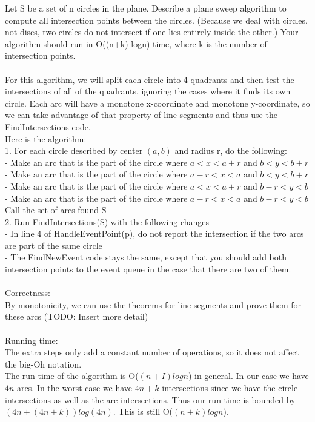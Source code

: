 \documentclass[11pt,psfig]{article}
\begin{document}
Let S be a set of n circles in the plane. Describe a plane sweep algorithm to compute all intersection points between the circles. (Because we deal with circles, not discs, two circles do not intersect if one lies entirely
inside the other.) Your algorithm should run in O((n+k) logn) time,
where k is the number of intersection points.\\
\\
For this algorithm, we will split each circle into 4 quadrants and then test the intersections of all of the quadrants, ignoring the cases where it finds its own circle. Each arc will have a monotone x-coordinate and monotone y-coordinate, so we can take advantage of that property of line segments and thus use the FindIntersections code. \\
Here is the algorithm:\\
1. For each circle described by center $(a,b)$ and radius r, do the following:\\
- Make an arc that is the part of the circle where $a < x < a+r$ and $b < y < b+r$\\
- Make an arc that is the part of the circle where $a-r < x < a$ and $b < y < b+r$\\
- Make an arc that is the part of the circle where $a < x < a+r$ and $b-r < y < b$\\
- Make an arc that is the part of the circle where $a-r < x < a$ and $b-r < y < b$\\
Call the set of arcs found S\\
2. Run FindIntersections(S) with the following changes\\
- In line 4 of HandleEventPoint(p), do not report the intersection if the two arcs are part of the same circle\\
- The FindNewEvent code stays the same, except that you should add both intersection points to the event queue in the case that there are two of them. \\
\\
Correctness:\\
By monotonicity, we can use the theorems for line segments and prove them for these arcs (TODO: Insert more detail)\\
\\
Running time:\\
The extra steps only add a constant number of operations, so it does not affect the big-Oh notation. \\
The run time of the algorithm is O($(n+I)logn$) in general. In our case we have $4n$ arcs. In the worst case we have $4n + k$ intersections since we have the circle intersections as well as the arc intersections. Thus our run time is bounded by $(4n + (4n+k) )log(4n)$. This is still O($(n+k)logn$).
\end{document}
